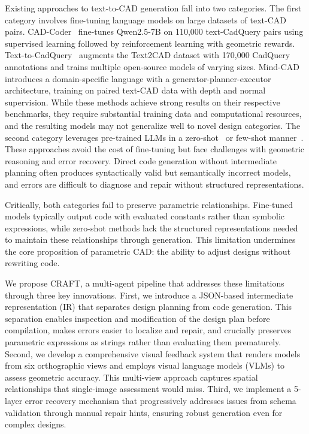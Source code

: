 \documentclass[5p,twocolumn,10pt,times]{elsarticle}
\begin{document}
Existing approaches to text-to-CAD generation fall into two categories. The first category involves fine-tuning language models on large datasets of text-CAD pairs. CAD-Coder~\cite{cadcoder2025} fine-tunes Qwen2.5-7B on 110,000 text-CadQuery pairs using supervised learning followed by reinforcement learning with geometric rewards. Text-to-CadQuery~\cite{text2cadquery2025} augments the Text2CAD dataset with 170,000 CadQuery annotations and trains multiple open-source models of varying sizes. Mind-CAD~\cite{mindcad2025} introduces a domain-specific language with a generator-planner-executor architecture, training on paired text-CAD data with depth and normal supervision. While these methods achieve strong results on their respective benchmarks, they require substantial training data and computational resources, and the resulting models may not generalize well to novel design categories. The second category leverages pre-trained LLMs in a zero-shot~\cite{li2025llm4cad} or few-shot manner~\cite{alrashedy2024generating}. These approaches avoid the cost of fine-tuning but face challenges with geometric reasoning and error recovery. Direct code generation without intermediate planning often produces syntactically valid but semantically incorrect models, and errors are difficult to diagnose and repair without structured representations.

Critically, both categories fail to preserve parametric relationships. Fine-tuned models typically output code with evaluated constants rather than symbolic expressions, while zero-shot methods lack the structured representations needed to maintain these relationships through generation. This limitation undermines the core proposition of parametric CAD: the ability to adjust designs without rewriting code.

We propose CRAFT, a multi-agent pipeline that addresses these limitations through three key innovations. First, we introduce a JSON-based intermediate representation (IR) that separates design planning from code generation. This separation enables inspection and modification of the design plan before compilation, makes errors easier to localize and repair, and crucially preserves parametric expressions as strings rather than evaluating them prematurely. Second, we develop a comprehensive visual feedback system that renders models from six orthographic views and employs visual language models (VLMs) to assess geometric accuracy. This multi-view approach captures spatial relationships that single-image assessment would miss. Third, we implement a 5-layer error recovery mechanism that progressively addresses issues from schema validation through manual repair hints, ensuring robust generation even for complex designs.
\end{document}
